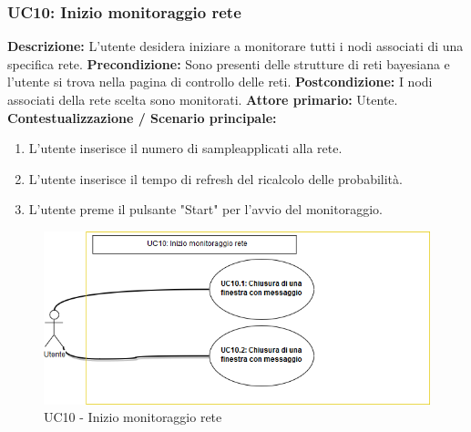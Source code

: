             \subsubsection{UC10: Inizio monitoraggio rete}
                    \textbf{Descrizione:}  L’utente desidera iniziare a monitorare tutti i nodi associati di una specifica rete.
                    \newline
                    \textbf{Precondizione:} Sono presenti delle strutture di reti bayesiana e l'utente si trova nella pagina di controllo delle reti.
                    \newline
                    \textbf{Postcondizione:} I nodi associati della rete scelta sono monitorati.
                    \newline
                    \textbf{Attore primario:} Utente.
                    \newline
                    \textbf{Contestualizzazione / Scenario principale:} \begin{enumerate}
                            \item L'utente inserisce il numero di sample\pedice applicati alla rete.
                            \item L'utente inserisce il tempo di refresh del ricalcolo delle probabilità.
                            \item L'utente preme il pulsante "Start" per l'avvio del monitoraggio.
                        \end{enumerate}
                        \clearpage
                        
                    \begin{figure}[!htbp]
                    	\centering
                    	\includegraphics[width=\textwidth]{UC10.png}
                    	\caption{UC10 - Inizio monitoraggio rete}
                    	\label{uc9}
                    \end{figure} 
                        
